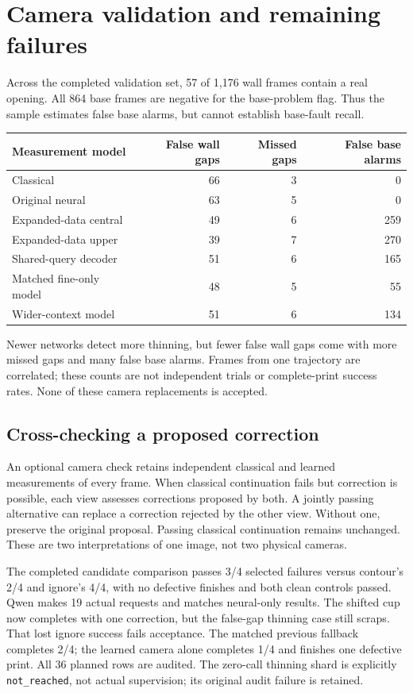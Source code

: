 \documentclass[10pt,letterpaper]{article}
\begin{document}
\clearpage
\section{Camera validation and remaining failures}

Across the completed validation set, 57 of 1,176 wall frames contain a real
opening. All 864 base frames are negative for the base-problem flag. Thus the
sample estimates false base alarms, but cannot establish base-fault recall.

\begin{center}
\begin{tabularx}{\linewidth}{@{}Yrrr@{}}
\toprule
Measurement model & False wall gaps & Missed gaps & False base alarms\\
\midrule
Classical & 66 & 3 & 0\\
Original neural & 63 & 5 & 0\\
Expanded-data central & 49 & 6 & 259\\
Expanded-data upper & 39 & 7 & 270\\
Shared-query decoder & 51 & 6 & 165\\
Matched fine-only model & 48 & 5 & 55\\
Wider-context model & 51 & 6 & 134\\
\bottomrule
\end{tabularx}
\end{center}
Newer networks detect more thinning, but fewer false wall gaps come with more
missed gaps and many false base alarms. Frames from one trajectory are correlated;
these counts are not independent trials or complete-print success rates. None of
these camera replacements is accepted.

\subsection*{Cross-checking a proposed correction}
An optional camera check retains independent classical and learned measurements
of every frame. When classical continuation fails but correction is possible,
each view assesses corrections proposed by both. A jointly passing alternative
can replace a correction rejected by the other view. Without one, preserve the
original proposal. Passing classical continuation remains unchanged. These are
two interpretations of one image, not two physical cameras.

The completed candidate comparison passes 3/4 selected failures versus contour's
2/4 and ignore's 4/4, with no defective finishes and both clean controls passed.
Qwen makes 19 actual requests and matches neural-only results. The shifted cup
now completes with one correction, but the false-gap thinning case still scraps.
That lost ignore success fails acceptance. The matched previous fallback completes
2/4; the learned camera alone completes 1/4 and finishes one defective print.
All 36 planned rows are audited. The zero-call thinning shard is explicitly
\texttt{not\_reached}, not actual supervision; its original audit failure is retained.
\end{document}
